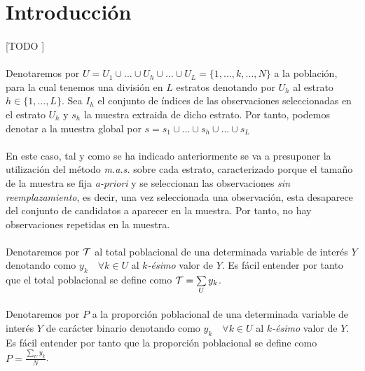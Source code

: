 \documentclass{article}
\begin{document}
  \maketitle


  \section{Introducción}

    \paragraph{}
    [TODO ]

    \paragraph{}
    Denotaremos por $U = U_1 \cup ... \cup U_h \cup... \cup U_L = \{1, ...,k,...,N\} $ a la población, para la cual tenemos una división en $L$ estratos denotando por $U_h$ al estrato $h \in \{1,..., L\}$. Sea $I_h$ el conjunto de índices de las observaciones seleccionadas en el estrato $U_h$ y $s_h$ la muestra extraida de dicho estrato. Por tanto, podemos denotar a la muestra global por $s = s_1 \cup ... \cup s_h \cup ... \cup s_L$

    \paragraph{}
    En este caso, tal y como se ha indicado anteriormente se va a presuponer la utilización del método \emph{m.a.s.} sobre cada estrato, caracterizado porque el tamaño de la muestra se fija \emph{a-priori} y se seleccionan las observaciones \emph{sin reemplazamiento}, es decir, una vez seleccionada una observación, esta desaparece del conjunto de candidatos a aparecer en la muestra. Por tanto, no hay observaciones repetidas en la muestra.

    \paragraph{}
    Denotaremos por $\mathcal{T}$ al total poblacional de una determinada variable de interés $Y$ denotando como $y_k \quad \forall k \in U$ al \emph{$k$-ésimo} valor de $Y$. Es fácil entender por tanto que el total poblacional se define como $\mathcal{T} = \sum\limits_U y_k$.

    \paragraph{}
    Denotaremos por $P$ a la proporción poblacional de una determinada variable de interés $Y$ de carácter binario denotando como $y_k \quad \forall k \in U$ al \emph{$k$-ésimo} valor de $Y$. Es fácil entender por tanto que la proporción poblacional se define como $P = \frac{\sum\limits_U y_k}{N}$.
\end{document}
